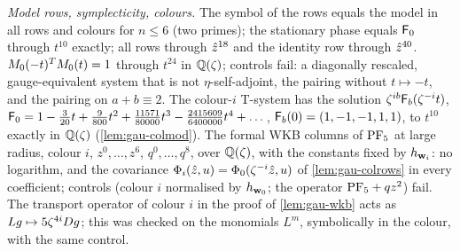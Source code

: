\emph{Model rows, symplecticity, colours.} The symbol of the rows equals the model in all rows and colours for $n\leq 6$ (two primes); the stationary phase equals $\mathsf{F}_0$ through $t^{10}$ exactly; all rows through $\hat{z}^{18}$ and the identity row through $\hat{z}^{40}$. $M_{0}(-t)^TM_{0}(t)=1$ through $t^{24}$ in $\mathbb{Q}(\zeta)$; controls fail: a diagonally rescaled, gauge-equivalent system that is not $\eta$-self-adjoint, the pairing without $t\mapsto -t$, and the pairing on $a+b\equiv 2$. The colour-$i$ T-system has the solution $\zeta^{ib}\mathsf{F}_b(\zeta^{-i}t)$, $\mathsf{F}_0=1-\tfrac{3}{20}t+\tfrac{9}{800}t^2+\tfrac{11571}{80000}t^3-\tfrac{2415609}{6400000}t^4+\dots$, $\mathsf{F}_b(0)=(1,-1,-1,1,1)$, to $t^{10}$ exactly in $\mathbb{Q}(\zeta)$ (\cref{lem:gau-colmod}). The formal WKB columns of $\mathrm{PF}_{5}$ at large radius, colour $i$, $z^0,\dots,z^6$, $q^0,\dots,q^8$, over $\mathbb{Q}(\zeta)$, with the constants fixed by $h_{\mathbf{w}_i}$: no logarithm, and the covariance $\Phi_i(\hat{z},u)=\Phi_0(\zeta^{-i}\hat{z},u)$ of \cref{lem:gau-colrows} in every coefficient; controls (colour $i$ normalised by $h_{\mathbf{w}_0}$; the operator $\mathrm{PF}_{5}+qz^2$) fail. The transport operator of colour $i$ in the proof of \cref{lem:gau-wkb} acts as $Lg\mapsto 5\zeta^{4i}D g$; this was checked on the monomials $L^m$, symbolically in the colour, with the same control.


